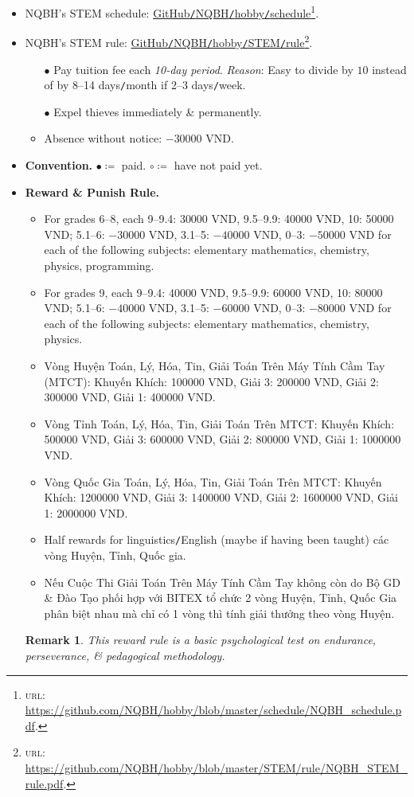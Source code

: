 \documentclass{article}
\newtheorem{remark}{Remark}
\begin{document}
\begin{itemize}
	\item NQBH's STEM schedule: \href{https://github.com/NQBH/hobby/blob/master/schedule/NQBH_schedule.pdf}{GitHub\texttt{/}NQBH\texttt{/}hobby\texttt{/}schedule}\footnote{\textsc{url}: \url{https://github.com/NQBH/hobby/blob/master/schedule/NQBH_schedule.pdf}.}.
	\item NQBH's STEM rule: \href{https://github.com/NQBH/hobby/blob/master/STEM/rule/NQBH_STEM_rule.pdf}{GitHub\texttt{/}NQBH\texttt{/}hobby\texttt{/}STEM\texttt{/}rule}\footnote{\textsc{url}: \url{https://github.com/NQBH/hobby/blob/master/STEM/rule/NQBH_STEM_rule.pdf}.}.
	\begin{itemize}
		\item[$\bullet$] Pay tuition fee each \textit{10-day period}. \textit{Reason}: Easy to divide by $10$ instead of by 8--14 days\texttt{/}month if 2--3 days\texttt{/}week.
		\item[$\bullet$] Expel thieves immediately \& permanently.
		\item Absence without notice: $-30000$ VND.
	\end{itemize}
	\item \textbf{Convention.} $\bullet\coloneq$ paid. $\circ\coloneq$ have not paid yet.
	\item \textbf{Reward \& Punish Rule.}
	\begin{itemize}
		\item For grades 6--8, each 9--9.4: 30000 VND, 9.5--9.9: 40000 VND, 10: 50000 VND; 5.1--6: $-30000$ VND, 3.1--5: $-40000$ VND, 0--3: $-50000$ VND for each of the following subjects: elementary mathematics, chemistry, physics, programming.
		\item For grades 9, each 9--9.4: 40000 VND, 9.5--9.9: 60000 VND, 10: 80000 VND; 5.1--6: $-40000$ VND, 3.1--5: $-60000$ VND, 0--3: $-80000$ VND for each of the following subjects: elementary mathematics, chemistry, physics.
		\item Vòng Huyện Toán, Lý, Hóa, Tin, Giải Toán Trên Máy Tính Cầm Tay (MTCT): Khuyến Khích: 100000 VND, Giải 3: 200000 VND, Giải 2: 300000 VND, Giải 1: 400000 VND.
		\item Vòng Tỉnh Toán, Lý, Hóa, Tin, Giải Toán Trên MTCT: Khuyến Khích: 500000 VND, Giải 3: 600000 VND, Giải 2: 800000 VND, Giải 1: 1000000 VND.
		\item Vòng Quốc Gia Toán, Lý, Hóa, Tin, Giải Toán Trên MTCT: Khuyến Khích: 1200000 VND, Giải 3: 1400000 VND, Giải 2: 1600000 VND, Giải 1: 2000000 VND.
		\item Half rewards for linguistics\texttt{/}English (maybe if having been taught) các vòng Huyện, Tỉnh, Quốc gia.
		\item Nếu Cuộc Thi Giải Toán Trên Máy Tính Cầm Tay không còn do Bộ GD \& Đào Tạo phối hợp với BITEX tổ chức 2 vòng Huyện, Tỉnh, Quốc Gia phân biệt nhau mà chỉ có 1 vòng thì tính giải thưởng theo vòng Huyện.
	\end{itemize}
		 
	\begin{remark}
		This reward rule is a basic psychological test on endurance, perseverance, \& pedagogical methodology.
	\end{remark}
\end{itemize}
\end{document}
